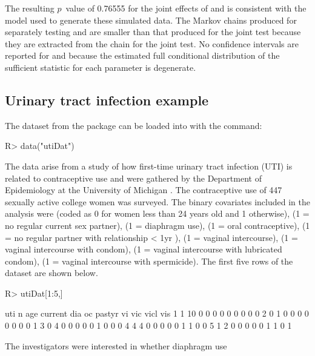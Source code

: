 \documentclass[article, shortnames]{jss}
\begin{document}
The resulting $p$~value of 0.76555 for the joint effects of
 and  is consistent with the model
used to generate these simulated data. The Markov chains produced
for separately testing  and  are
smaller than that produced for the joint test because they are
extracted from the chain for the joint test. No confidence
intervals are reported for  and 
because the estimated full conditional distribution of the
sufficient statistic for each parameter is degenerate.

\subsection{Urinary tract infection example}

The  dataset from the  package
can be loaded into  with the
command:
\begin{CodeInput}
R> data("utiDat")
\end{CodeInput}
The data arise from a study of how first-time urinary tract
infection (UTI) is related to contraceptive use and were gathered
by the Department of Epidemiology at the University of Michigan
\citep{Cytel:2006}. The contraceptive use of 447 sexually active
college women was surveyed. The binary covariates included in the
analysis were  (coded as 0 for women less than 24 years
old and 1 otherwise),  (1 = no regular current sex
partner),  (1 = diaphragm use),  (1 = oral
contraceptive),  (1 = no regular partner with
relationship < 1yr ),  (1 = vaginal intercourse),
 (1 = vaginal intercourse with condom),  (1 =
vaginal intercourse with lubricated condom),  (1 =
vaginal intercourse with spermicide). The first five rows of the
dataset are shown below.
\begin{CodeChunk}
\begin{CodeInput}
R> utiDat[1:5,]
\end{CodeInput}
\begin{CodeOutput}
  uti  n age current dia oc pastyr vi vic vicl vis
1   1 10   0       0   0  0      0  0   0    0   0
2   0  1   0       0   0  0      0  0   0    0   1
3   0  4   0       0   0  0      0  1   0    0   0
4   4  4   0       0   0  0      0  1   1    0   0
5   1  2   0       0   0  0      0  1   1    0   1
\end{CodeOutput}
\end{CodeChunk}
The investigators were interested in whether diaphragm use
\end{document}
